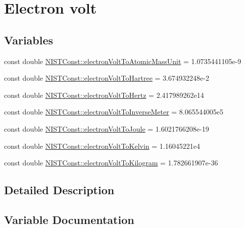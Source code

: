 \hypertarget{group___electron_volt}{}\section{Electron volt}
\label{group___electron_volt}
\subsection*{Variables}
\begin{DoxyCompactItemize}
\item 
const double \hyperlink{group___electron_volt_gabd56c1195e7ce2bb9c314e88b43e30ab}{N\+I\+S\+T\+Const\+::electron\+Volt\+To\+Atomic\+Mass\+Unit} = 1.\+0735441105e-\/9
\item 
const double \hyperlink{group___electron_volt_gab05ba497cc5a6bd566356469e9de003a}{N\+I\+S\+T\+Const\+::electron\+Volt\+To\+Hartree} = 3.\+674932248e-\/2
\item 
const double \hyperlink{group___electron_volt_gae80c1242d33bf681a09a87d20cd4162e}{N\+I\+S\+T\+Const\+::electron\+Volt\+To\+Hertz} = 2.\+417989262e14
\item 
const double \hyperlink{group___electron_volt_ga4c109b95727a76ae489a8dec36a88b65}{N\+I\+S\+T\+Const\+::electron\+Volt\+To\+Inverse\+Meter} = 8.\+065544005e5
\item 
const double \hyperlink{group___electron_volt_ga51a94280936d8d7e92cbac054e1df485}{N\+I\+S\+T\+Const\+::electron\+Volt\+To\+Joule} = 1.\+6021766208e-\/19
\item 
const double \hyperlink{group___electron_volt_ga9cd0e681c5b9edabd2f1840c88d90176}{N\+I\+S\+T\+Const\+::electron\+Volt\+To\+Kelvin} = 1.\+16045221e4
\item 
const double \hyperlink{group___electron_volt_ga21481a673cb040e04f7f8f95581ece0c}{N\+I\+S\+T\+Const\+::electron\+Volt\+To\+Kilogram} = 1.\+782661907e-\/36
\end{DoxyCompactItemize}


\subsection{Detailed Description}


\subsection{Variable Documentation}
\mbox{\label{group___electron_volt_gabd56c1195e7ce2bb9c314e88b43e30ab}} 
